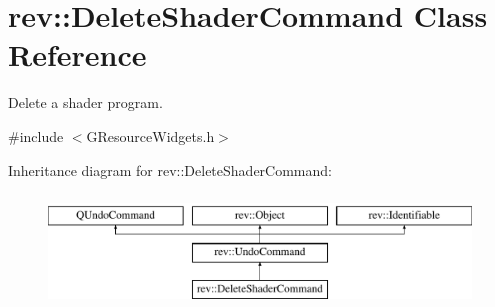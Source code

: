 \hypertarget{classrev_1_1_delete_shader_command}{}\section{rev\+::Delete\+Shader\+Command Class Reference}
\label{classrev_1_1_delete_shader_command}


Delete a shader program.  




{\ttfamily \#include $<$G\+Resource\+Widgets.\+h$>$}

Inheritance diagram for rev\+::Delete\+Shader\+Command\+:\begin{figure}[H]
\begin{center}
\leavevmode
\includegraphics[height=3.000000cm]{classrev_1_1_delete_shader_command}
\end{center}
\end{figure}
